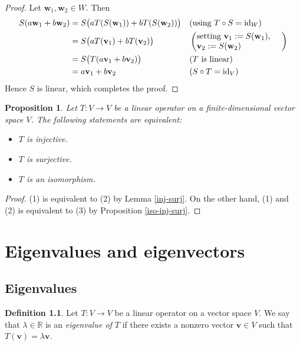 \documentclass[a4paper,11pt]{book}
\newtheorem{proposition}[theorem]{Proposition}
\theoremstyle{definition}
\newtheorem{definition}[theorem]{Definition}
\newcommand{\ve}[1]{\mathbf{#1}}
\DeclareMathOperator{\id}{id}
\begin{document}
\begin{proof}
Let $\ve{w}_1, \ve{w}_2 \in W$. Then
\begin{align*}
S( a \ve{w}_1 + b \ve{w}_2) &= S\big(a T(S(\ve{w}_1)) + b T(S(\ve{w}_2)) \big) && \mbox{(using $T \circ S = \id_W$)} \\
&= S\big( a T(\ve{v}_1) + b T(\ve{v}_2) \big) && \left(\mbox{\begin{minipage}{3.5cm}
setting $\ve{v}_1 := S(\ve{w}_1)$, \\ 
$\ve{v}_2 := S(\ve{w}_2)$ 
\end{minipage} } \right)
 \\
&= S\big(T(a \ve{v}_1 + b \ve{v}_2)\big) && \mbox{($T$ is linear)} \\
&= a \ve{v}_1 + b \ve{v}_2 && \mbox{($S \circ T = \id_V$)}
\end{align*}
Hence $S$ is linear, which completes the proof.
\end{proof}

\begin{proposition} \label{equiv-inj-sur-iso} Let $T : V \rightarrow V$ be a linear operator on a finite-dimensional vector space $V$. The following statements are equivalent:
\begin{itemize}
\item[1.] $T$ is injective.
\item[2.] $T$ is surjective.
\item[3.] $T$ is an isomorphism.
\end{itemize}
\end{proposition}
\begin{proof} (1) is equivalent to (2) by Lemma \ref{inj-surj}. On the other hand, (1) and (2) is equivalent to  (3) by Proposition \ref{iso-inj-surj}.
\end{proof}


\chapter{Eigenvalues and eigenvectors} \label{Ch4EigenvaluesEigenvectors}
\section{Eigenvalues} \label{Ch4Sec1Eigenvalues}

\begin{definition} Let $T : V \rightarrow V$ be a linear operator on a vector space $V$. We say that $\lambda \in \mathbb{R}$ is an {\em eigenvalue of $T$} if there exists a nonzero vector $\ve{v} \in V$ such that $T(\ve{v}) = \lambda \ve{v}$.
\end{definition}
\end{document}
